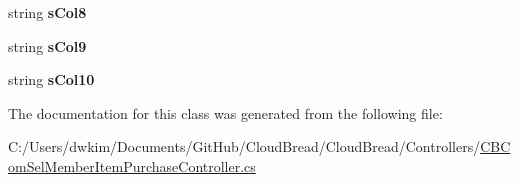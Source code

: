\begin{DoxyCompactItemize}
\item 
string {\bfseries s\+Col8}\hypertarget{class_cloud_bread_1_1_controllers_1_1_c_b_com_sel_member_item_purchase_controller_1_1_model_a91edd028193e2a77e35607a354738fc6}{}\label{class_cloud_bread_1_1_controllers_1_1_c_b_com_sel_member_item_purchase_controller_1_1_model_a91edd028193e2a77e35607a354738fc6}

\item 
string {\bfseries s\+Col9}\hypertarget{class_cloud_bread_1_1_controllers_1_1_c_b_com_sel_member_item_purchase_controller_1_1_model_a3f0af21626476a5f22203c71c1bfdf9c}{}\label{class_cloud_bread_1_1_controllers_1_1_c_b_com_sel_member_item_purchase_controller_1_1_model_a3f0af21626476a5f22203c71c1bfdf9c}

\item 
string {\bfseries s\+Col10}\hypertarget{class_cloud_bread_1_1_controllers_1_1_c_b_com_sel_member_item_purchase_controller_1_1_model_ad333b6b72b49834c9c6a540568b27321}{}\label{class_cloud_bread_1_1_controllers_1_1_c_b_com_sel_member_item_purchase_controller_1_1_model_ad333b6b72b49834c9c6a540568b27321}

\end{DoxyCompactItemize}


The documentation for this class was generated from the following file\+:\begin{DoxyCompactItemize}
\item 
C\+:/\+Users/dwkim/\+Documents/\+Git\+Hub/\+Cloud\+Bread/\+Cloud\+Bread/\+Controllers/\hyperlink{_c_b_com_sel_member_item_purchase_controller_8cs}{C\+B\+Com\+Sel\+Member\+Item\+Purchase\+Controller.\+cs}\end{DoxyCompactItemize}
